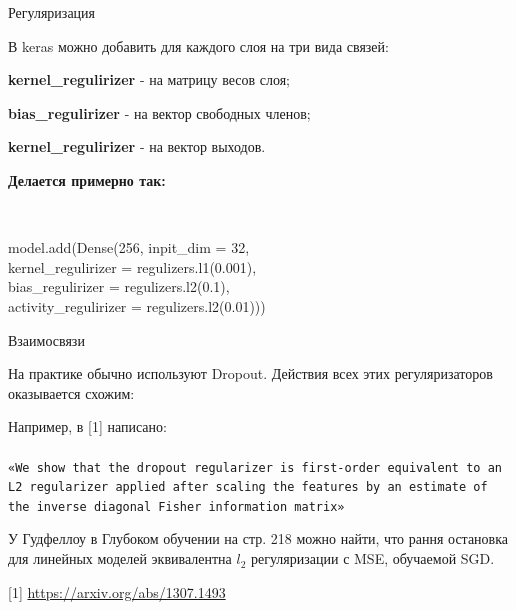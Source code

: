 \documentclass[notes,12pt, aspectratio=169]{beamer}
\newcommand{\pgr}[1]{{\color{green} \textbf{#1}}}
\newenvironment{wideitemize}{\itemize\addtolength{\itemsep}{10pt}}{\enditemize}
\begin{document}
\begin{frame}{Регуляризация}
\begin{wideitemize}
\item В keras можно добавить для каждого слоя на три вида связей: 

\item \textbf{kernel\_regulirizer} - на матрицу весов слоя;

\item \textbf{bias\_regulirizer} - на вектор свободных членов;

\item \textbf{kernel\_regulirizer} - на вектор выходов.

\item \textbf{Делается примерно так:}

\mbox{ }

\pgr{\hspace{50pt}} model.add(Dense(256, inpit\_dim = 32, \\
\pgr{\hspace{80pt}}  kernel\_regulirizer = regulizers.l1(0.001), \\
\pgr{\hspace{80pt}} bias\_regulirizer = regulizers.l2(0.1), \\
\pgr{\hspace{80pt}} activity\_regulirizer = regulizers.l2(0.01))) 
\end{wideitemize}
\end{frame}


\begin{frame}{Взаимосвязи}
\begin{wideitemize}
\item  На практике обычно используют Dropout. Действия всех этих регуляризаторов оказывается схожим: 

\item Например, в [1] написано: \\ \mbox{   } \\

\texttt{«We show that the dropout regularizer is first-order equivalent to an L2 regularizer applied after scaling the features by an estimate of the inverse diagonal Fisher information matrix»}

\item  У Гудфеллоу в Глубоком обучении на стр. 218 можно найти, что рання остановка для линейных моделей эквивалентна $l_2$ регуляризации с MSE, обучаемой SGD.

\end{wideitemize}

\vfill %
\footnotesize 
\color{blue} [1] \url{https://arxiv.org/abs/1307.1493} 
\end{frame}
\end{document}
